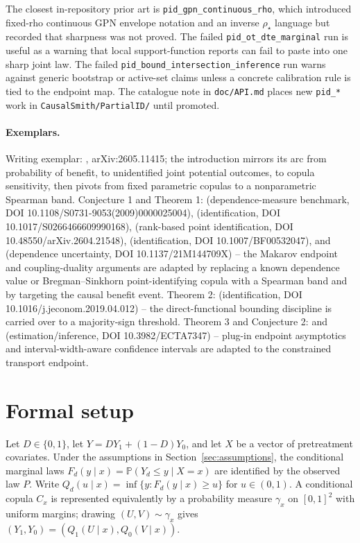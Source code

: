 \documentclass[11pt]{article}
\renewcommand{\Pr}{\mathbb{P}}
\theoremstyle{definition}
\theoremstyle{plain}
\theoremstyle{remark}
\begin{document}
The closest in-repository prior art is \texttt{pid\_gpn\_continuous\_rho}, which introduced fixed-rho continuous GPN envelope notation and an inverse \(\rho_\star\) language but recorded that sharpness was not proved.  The failed \texttt{pid\_ot\_dte\_marginal} run is useful as a warning that local support-function reports can fail to paste into one sharp joint law.  The failed \texttt{pid\_bound\_intersection\_inference} run warns against generic bootstrap or active-set claims unless a concrete calibration rule is tied to the endpoint map.  The catalogue note in \texttt{doc/API.md} places new \texttt{pid\_*} work in \texttt{CausalSmith/PartialID/} until promoted.

\paragraph{Exemplars.}
Writing exemplar: \citet{HeLi2026OrdinalCopula}, arXiv:2605.11415; the introduction mirrors its arc from probability of benefit, to unidentified joint potential outcomes, to copula sensitivity, then pivots from fixed parametric copulas to a nonparametric Spearman band.  Conjecture 1 and Theorem 1: \citet{FanPark2009DTEConfidenceSets} (dependence-measure benchmark, DOI 10.1108/S0731-9053(2009)0000025004), \citet{FanPark2010DTEBounds} (identification, DOI 10.1017/S0266466609990168), \citet{Liang2026RankStickiness} (rank-based point identification, DOI 10.48550/arXiv.2604.21548), \citet{Kellerer1984Duality} (identification, DOI 10.1007/BF00532047), and \citet{BartlKupperLuxPapapantoleon2022Dependence} (dependence uncertainty, DOI 10.1137/21M144709X) -- the Makarov endpoint and coupling-duality arguments are adapted by replacing a known dependence value or Bregman--Sinkhorn point-identifying copula with a Spearman band and by targeting the causal benefit event.  Theorem 2: \citet{FirpoRidder2019Functionals} (identification, DOI 10.1016/j.jeconom.2019.04.012) -- the direct-functional bounding discipline is carried over to a majority-sign threshold.  Theorem 3 and Conjecture 2: \citet{FanPark2010DTEBounds} and \citet{Stoye2009MoreCI} (estimation/inference, DOI 10.3982/ECTA7347) -- plug-in endpoint asymptotics and interval-width-aware confidence intervals are adapted to the constrained transport endpoint.

\section{Formal setup}
Let \(D\in\{0,1\}\), let \(Y=DY_1+(1-D)Y_0\), and let \(X\) be a vector of pretreatment covariates.  Under the assumptions in Section~\ref{sec:assumptions}, the conditional marginal laws \(F_d(y\mid x)=\Pr(Y_d\le y\mid X=x)\) are identified by the observed law \(P\).  Write \(Q_d(u\mid x)=\inf\{y:F_d(y\mid x)\ge u\}\) for \(u\in(0,1)\).  A conditional copula \(C_x\) is represented equivalently by a probability measure \(\gamma_x\) on \([0,1]^2\) with uniform margins; drawing \((U,V)\sim\gamma_x\) gives \((Y_1,Y_0)=(Q_1(U\mid x),Q_0(V\mid x))\).
\end{document}
